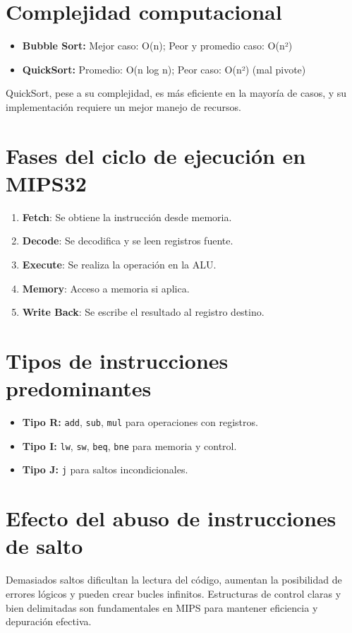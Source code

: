 \documentclass[12pt]{article}
\begin{document}
\section{Complejidad computacional}
\begin{itemize}
    \item \textbf{Bubble Sort:} Mejor caso: O(n); Peor y promedio caso: O(n²)
    \item \textbf{QuickSort:} Promedio: O(n log n); Peor caso: O(n²) (mal pivote)
\end{itemize}
QuickSort, pese a su complejidad, es más eficiente en la mayoría de casos, y su implementación requiere un mejor manejo de recursos.

\section{Fases del ciclo de ejecución en MIPS32}
\begin{enumerate}
    \item \textbf{Fetch}: Se obtiene la instrucción desde memoria.
    \item \textbf{Decode}: Se decodifica y se leen registros fuente.
    \item \textbf{Execute}: Se realiza la operación en la ALU.
    \item \textbf{Memory}: Acceso a memoria si aplica.
    \item \textbf{Write Back}: Se escribe el resultado al registro destino.
\end{enumerate}

\section{Tipos de instrucciones predominantes}
\begin{itemize}
    \item \textbf{Tipo R:} \texttt{add}, \texttt{sub}, \texttt{mul} para operaciones con registros.
    \item \textbf{Tipo I:} \texttt{lw}, \texttt{sw}, \texttt{beq}, \texttt{bne} para memoria y control.
    \item \textbf{Tipo J:} \texttt{j} para saltos incondicionales.
\end{itemize}

\section{Efecto del abuso de instrucciones de salto}
Demasiados saltos dificultan la lectura del código, aumentan la posibilidad de errores lógicos y pueden crear bucles infinitos. Estructuras de control claras y bien delimitadas son fundamentales en MIPS para mantener eficiencia y depuración efectiva.
\end{document}
